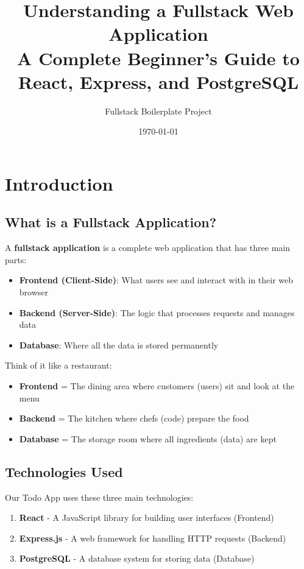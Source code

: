 \documentclass[12pt,a4paper]{article}
\title{\textbf{Understanding a Fullstack Web Application} \\ 
\large A Complete Beginner's Guide to React, Express, and PostgreSQL}
\author{Fullstack Boilerplate Project}
\date{\today}
\begin{document}
\maketitle
\tableofcontents
\newpage

\section{Introduction}

\subsection{What is a Fullstack Application?}

A \textbf{fullstack application} is a complete web application that has three main parts:

\begin{itemize}
    \item \textbf{Frontend (Client-Side)}: What users see and interact with in their web browser
    \item \textbf{Backend (Server-Side)}: The logic that processes requests and manages data
    \item \textbf{Database}: Where all the data is stored permanently
\end{itemize}

\begin{tcolorbox}[colback=blue!5!white,colframe=blue!75!black,title=Analogy: Restaurant]
Think of it like a restaurant:
\begin{itemize}
    \item \textbf{Frontend} = The dining area where customers (users) sit and look at the menu
    \item \textbf{Backend} = The kitchen where chefs (code) prepare the food
    \item \textbf{Database} = The storage room where all ingredients (data) are kept
\end{itemize}
\end{tcolorbox}

\subsection{Technologies Used}

Our Todo App uses these three main technologies:

\begin{enumerate}
    \item \textbf{React} - A JavaScript library for building user interfaces (Frontend)
    \item \textbf{Express.js} - A web framework for handling HTTP requests (Backend)
    \item \textbf{PostgreSQL} - A database system for storing data (Database)
\end{enumerate}
\end{document}
